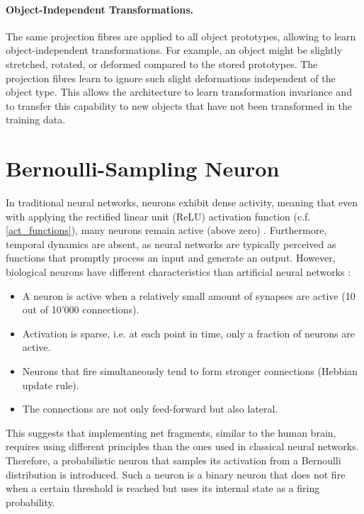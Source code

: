 \paragraph{Object-Independent Transformations.} The same projection fibres are applied to all object prototypes, allowing to learn object-independent transformations. For example, an object might be slightly stretched, rotated, or deformed compared to the stored prototypes. The projection fibres learn to ignore such slight deformations independent of the object type. This allows the architecture to learn transformation invariance and to transfer this capability to new objects that have not been transformed in the training data.


\section{Bernoulli-Sampling Neuron}
In traditional neural networks, neurons exhibit dense activity, meaning that even with applying the rectified linear unit (ReLU) activation function (c.f. \eqref{act_functions}), many neurons remain active (above zero) . Furthermore, temporal dynamics are absent, as neural networks are typically perceived as functions that promptly process an input and generate an output. However, biological neurons have different characteristics than artificial neural networks :

\begin{itemize}
    \item A neuron is active when a relatively small amount of synapses are active (10 out of 10'000 connections). 
    \item Activation is sparse, i.e. at each point in time, only a fraction of neurons are active.
    \item Neurons that fire simultaneously tend to form stronger connections (Hebbian update rule).
    \item The connections are not only feed-forward but also lateral.
\end{itemize}

This suggests that implementing net fragments, similar to the human brain, requires using different principles than the ones used in classical neural networks. Therefore, a probabilistic neuron that samples its activation from a Bernoulli distribution is introduced.
Such a neuron is a binary neuron that does not fire when a certain threshold is reached but uses its internal state as a firing probability.

